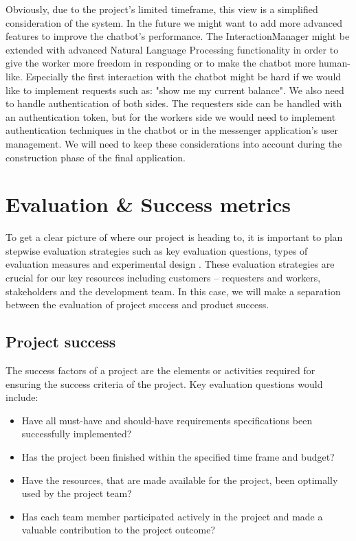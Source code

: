 \documentclass[a4paper,dutch,fleqn]{exam}
\begin{document}
Obviously, due to the project's limited timeframe, this view is a simplified consideration of the system. In the future we might want to add more advanced features to improve the chatbot's performance. The InteractionManager might be extended with advanced Natural Language Processing functionality in order to give the worker more freedom in responding or to make the chatbot more human-like. Especially the first interaction with the chatbot might be hard if we would like to implement requests such as: "show me my current balance". 
We also need to handle authentication of both sides. The requesters side can be handled with an authentication token, but for the workers side we would need to implement authentication techniques in the chatbot or in the messenger application's user management. We will need to keep these considerations into account during the construction phase of the final application.

\newpage 

\section{Evaluation \& Success metrics}
To get a clear picture of where our project is heading to, it is important to plan stepwise evaluation strategies such as key evaluation questions, types of evaluation measures and experimental design \cite{patton2002two}. These evaluation strategies are crucial for our key resources including customers – requesters and workers, stakeholders and the development team.
In this case, we will make a separation between the evaluation of project success and product success. 
 
\subsection{Project success}
The success factors of a project are the elements or activities required for ensuring the success criteria of the project. Key evaluation questions would include:
\begin{itemize}
\itemsep0em 
\item Have all must-have and should-have requirements specifications been successfully implemented?
\item Has the project been finished within the specified time frame and budget? 
\item Have the resources, that are made available for the project, been optimally used by the project team?
\item Has each team member participated actively in the project and made a valuable contribution to the project outcome?
\end{itemize}
\end{document}
